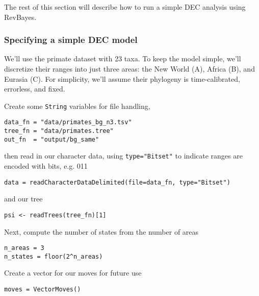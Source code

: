 The rest of this section will describe how to run a simple DEC analysis using RevBayes.

\newpage


\subsubsection{Specifying a simple DEC model}

We'll use the primate dataset with 23 taxa. To keep the model simple, we'll discretize their ranges into just three areas: the New World (A), Africa (B), and Eurasia (C).
For simplicity, we'll assume their phylogeny is time-calibrated, errorless, and fixed.

Create some {\tt String} variables for file handling,
{\tt \small \begin{snugshade}
\begin{lstlisting}
data_fn = "data/primates_bg_n3.tsv"
tree_fn = "data/primates.tree"
out_fn  = "output/bg_same"
\end{lstlisting}
\end{snugshade} }

then read in our character data, using {\tt type="Bitset"} to indicate ranges are encoded with bits, e.g. 011

\begin{snugshade}
\begin{lstlisting}
data = readCharacterDataDelimited(file=data_fn, type="Bitset")
\end{lstlisting}
\end{snugshade}

and our tree

\begin{snugshade}
\begin{lstlisting}
psi <- readTrees(tree_fn)[1]
\end{lstlisting}
\end{snugshade}

Next, compute the number of states from the number of areas

\begin{snugshade}
\begin{lstlisting}
n_areas = 3
n_states = floor(2^n_areas)
\end{lstlisting}
\end{snugshade}

Create a vector for our moves for future use

\begin{snugshade}
\begin{lstlisting}
moves = VectorMoves()
\end{lstlisting}
\end{snugshade}

